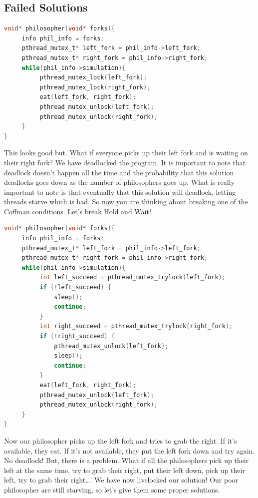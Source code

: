 \subsection{Failed Solutions}

\begin{lstlisting}[language=C]
void* philosopher(void* forks){
     info phil_info = forks;
     pthread_mutex_t* left_fork = phil_info->left_fork;
     pthread_mutex_t* right_fork = phil_info->right_fork;
     while(phil_info->simulation){
          pthread_mutex_lock(left_fork);
          pthread_mutex_lock(right_fork);
          eat(left_fork, right_fork);
          pthread_mutex_unlock(left_fork);
          pthread_mutex_unlock(right_fork);
     }
}
\end{lstlisting}

This looks good but.
What if everyone picks up their left fork and is waiting on their right fork? We have deadlocked the program.
It is important to note that deadlock doesn't happen all the time and the probability that this solution deadlocks goes down as the number of philosophers goes up.
What is really important to note is that eventually that this solution will deadlock, letting threads starve which is bad.
So now you are thinking about breaking one of the Coffman conditions.
Let's break Hold and Wait!

\begin{lstlisting}[language=C]
void* philosopher(void* forks){
     info phil_info = forks;
     pthread_mutex_t* left_fork = phil_info->left_fork;
     pthread_mutex_t* right_fork = phil_info->right_fork;
     while(phil_info->simulation){
          int left_succeed = pthread_mutex_trylock(left_fork);
          if (!left_succeed) {
              sleep();
              continue;
          }
          int right_succeed = pthread_mutex_trylock(right_fork);
          if (!right_succeed) {
              pthread_mutex_unlock(left_fork);
              sleep();
              continue;
          }
          eat(left_fork, right_fork);
          pthread_mutex_unlock(left_fork);
          pthread_mutex_unlock(right_fork);
     }
}
\end{lstlisting}

Now our philosopher picks up the left fork and tries to grab the right.
If it's available, they eat.
If it's not available, they put the left fork down and try again.
No deadlock! But, there is a problem.
What if all the philosophers pick up their left at the same time, try to grab their right, put their left down, pick up their left, try to grab their right\ldots{}.
We have now livelocked our solution! Our poor philosopher are still starving, so let's give them some proper solutions.

